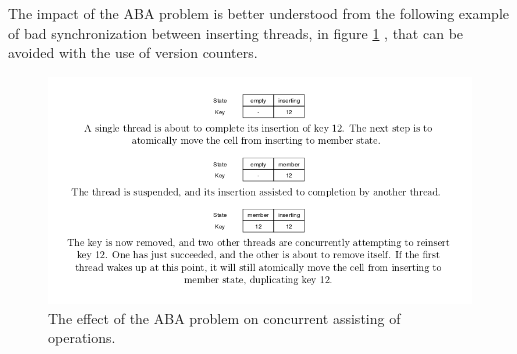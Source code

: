 The impact of the ABA problem is better understood from the following example of bad synchronization between inserting threads, in figure \ref{non_blocking_3} , that can be avoided with the use of version counters.

\begin{figure}
 \centering
  \includegraphics[scale=0.5]{non_blocking_3.png}
\caption{The effect of the ABA problem on concurrent assisting of operations.}
\label{non_blocking_3}
\end{figure}
